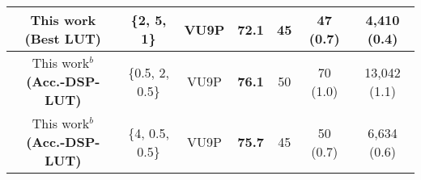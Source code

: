\begin{table}[t]
{\begin{threeparttable}
\begin{tabular}{c| c | c |c |c | c |c }
This work \textbf{(Best LUT)} 
& \{2, 5, 1\} & VU9P & 72.1 & 45 
& 47 (0.7)
& 4,410 (0.4)
 \\
\midrule

This work$^b$ \textbf{(Acc.-DSP-LUT)}  
& \{0.5, 2, 0.5\} & VU9P & \textbf{76.1} & 50 
& 70 (1.0)
& 13,042 (1.1)
 \\
\midrule

This work$^b$ \textbf{(Acc.-DSP-LUT)}
& \{4, 0.5, 0.5\} & VU9P & \textbf{75.7} & 45 
& 50 (0.7)
& 6,634 (0.6)
 \\

\midrule


\end{tabular}
\end{threeparttable}}
\end{table}
